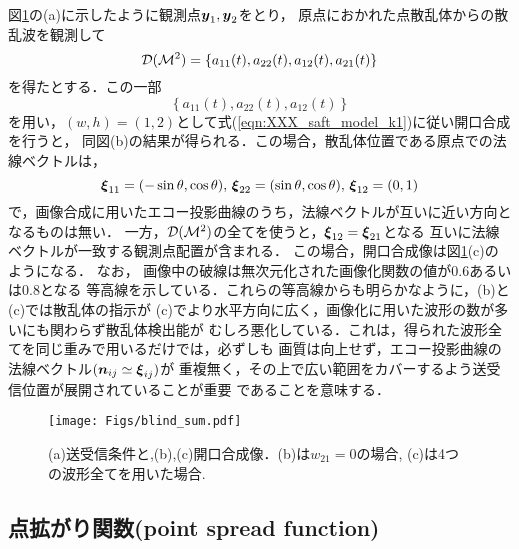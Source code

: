 図\ref{fig:XXX_blind_sum}の(a)に示したように観測点$\mbox{\boldmath $y$}_1,\mbox{\boldmath $y$}_2$をとり，
原点におかれた点散乱体からの散乱波を観測して
\begin{equation}
	{\cal D}({\cal M}^2)=\left\{
		a_{11}(t), a_{22}(t), a_{12}(t) , a_{21}(t)
		\right\}
	\label{eqn:}
\end{equation}
を得たとする．この一部
\begin{equation}
	\left\{ 
		a_{11}(t), a_{22}(t), a_{12}(t) 
	\right\}
	\label{eqn:}
\end{equation}
を用い，$(w,h)=(1,2)$として式(\ref{eqn:XXX_saft_model_k1})に従い開口合成を行うと，
同図(b)の結果が得られる．この場合，散乱体位置である原点での法線ベクトルは，
\begin{equation}
	\mbox{\boldmath $\xi$}_{11}=(-\sin\theta,\cos\theta), \,
	\mbox{\boldmath $\xi$}_{22}=( \sin\theta,\cos\theta), \,
	\mbox{\boldmath $\xi$}_{12}=(0,1)
	\label{eqn:XXX_11}
\end{equation}
で，画像合成に用いたエコー投影曲線のうち，法線ベクトルが互いに近い方向となるものは無い．
一方，${\cal D}({\cal M}^2)$の全てを使うと，$\mbox{\boldmath $\xi$}_{12}=\mbox{\boldmath $\xi$}_{21}$となる
互いに法線ベクトルが一致する観測点配置が含まれる．
この場合，開口合成像は図\ref{fig:XXX_blind_sum}(c)のようになる．
なお，
画像中の破線は無次元化された画像化関数の値が0.6あるいは0.8となる
等高線を示している．これらの等高線からも明らかなように，(b)と(c)では散乱体の指示が
(c)でより水平方向に広く，画像化に用いた波形の数が多いにも関わらず散乱体検出能が
むしろ悪化している．これは，得られた波形全てを同じ重みで用いるだけでは，必ずしも
画質は向上せず，エコー投影曲線の法線ベクトル$(\mbox{\boldmath $n$}_{ij}\simeq \mbox{\boldmath $\xi$}_{ij})$が
重複無く，その上で広い範囲をカバーするよう送受信位置が展開されていることが重要
であることを意味する．
\begin{figure}[h]
	\begin{center}
	\texttt{[image: Figs/blind\_sum.pdf]} 
	\end{center}
	\caption{(a)送受信条件と,(b),(c)開口合成像．(b)は$w_{21}=0$の場合, (c)は4つの波形全てを用いた場合.}
	\label{fig:XXX_blind_sum}
\end{figure}
\subsection{点拡がり関数(point spread function)}
